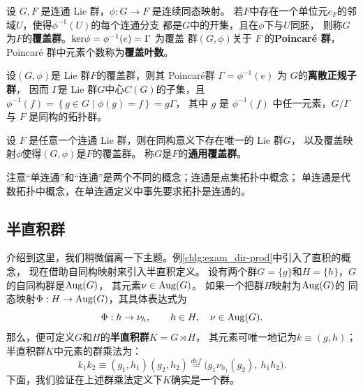 \begin{definition}
    设 $G, F$ 是连通 Lie 群，$\phi: G \rightarrow F$ 是连续同态映射。
    若$F$中存在一个单位元$e_F$的邻域$U$，使得$\phi^{-1}(U)$的每个连通分支
    都是$G$中的开集，且在$\phi$下与$U$同胚，
    则称$G$为$F$的\textbf{覆盖群}。${\rm ker} \phi=\phi^{-1}(e)=\Gamma$ 为覆盖
    群$(G, \phi)$关于 $F$ 的{\heiti\bfseries Poincar\'e 群}，Poincar\'e 群中元素个数称为\textbf{覆盖叶数}。
\end{definition}

\begin{theorem}
    设$(G, \phi)$是 Lie 群$F$的覆盖群，则其 Poincar\'e群 $\Gamma=\phi^{-1}(e)$ 为 $G$的\textbf{离散正规子群}，
    因而 $\Gamma$是 Lie 群$G$中心$C (G)$的子集，且 $\phi^{-1}(f)=\left\{g \in G \mid \phi(g)=f\right\}=g \Gamma$，
    其中 $g$ 是 $\phi^{-1}(f)$ 中任一元素，$G / \Gamma$ 与 $F$ 是同构的拓扑群。
\end{theorem}

\begin{theorem}
    设 $F$ 是任意一个连通 Lie 群，则在同构意义下存在唯一的 Lie 群$G$，
    以及覆盖映射$\phi$使得$(G,\phi)$是$F$的覆盖群。    
    称$G$是$F$的\textbf{通用覆盖群}。
\end{theorem}


注意“单连通”和“连通”是两个不同的概念；连通是点集拓扑中概念；
单连通是代数拓扑中概念，在单连通定义中事先要求拓扑是连通的。



\subsection{半直积群}\label{chlg:sec_semi-dir-prod}
介绍到这里，我们稍微偏离一下主题。例\ref{chlg:exam_dir-prod}中引入了{\kaishu 直积}的概念，
现在借助自同构映射来引入{\kaishu 半直积}定义。
设有两个群$G=\{g\}$和$H=\{h\}$，$G$的自同构群是${\rm Aug}(G)$，
其元素$\nu \in {\rm Aug}(G)$。
如果一个把群$H$映射为${\rm Aug}(G)$的
同态映射$\Phi:H\to {\rm Aug}(G)$，其具体表达式为
\begin{equation}
    \Phi : h \to \nu_h ,\qquad h\in H,\quad \nu \in {\rm Aug}(G).
\end{equation}
那么，便可定义$G$和$H$的\textbf{半直积群}$K=G  \rtimes H$，
其元素可唯一地记为$k\equiv (g,h)$； %
半直积群$K$中元素的群乘法为：
\begin{equation}\label{chlg:eqn_semi-dir-prod}
    k_1 k_2 \equiv (g_1, h_1) (g_2, h_2)
    \overset{def}{=} \bigl(g_1 \nu_{h_1}(g_2),\ h_1 h_2 \bigr) .
\end{equation}
下面，我们验证在上述群乘法定义下$K$确实是一个群。

